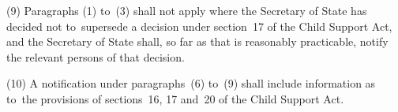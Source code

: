 \documentclass[12pt,a4paper]{article}
\begin{document}
%
%

(9) Paragraphs (1) to~(3) shall not apply where the 
Secretary of State  %
has decided not to~supersede a decision under section~17 of the Child Support Act, and 
the Secretary of State  %
shall, so far as that is reasonably practicable, notify the relevant persons of that decision.

(10) A notification under paragraphs~(6) to~(9) shall include information as to~the provisions of sections~16, 17 and~20 of the Child Support Act.
\end{document}
